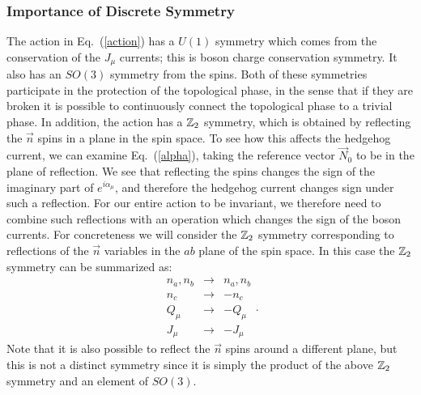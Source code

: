 \subsubsection{Importance of Discrete Symmetry}
\label{subsubsec:HeisSym}

The action in Eq.~(\ref{action}) has a $U(1)$ symmetry which comes from the conservation of the $J_\mu$ currents; this is boson charge conservation symmetry. It also has an $SO(3)$ symmetry from the spins. Both of these symmetries participate in the protection of the topological phase, in the sense that if they are broken it is possible to continuously connect the topological phase to a trivial phase.
In addition, the action has a $\mathbb{Z}_2$ symmetry, which is obtained by reflecting the $\vec{n}$ spins in a plane in the spin space. To see how this affects the hedgehog current, we can examine Eq.~(\ref{alpha}), taking the reference vector $\vec{N}_0$ to be in the plane of reflection. We see that reflecting the spins changes the sign of the imaginary part of $e^{i\alpha_\mu}$, and therefore the hedgehog current changes sign under such a reflection. For our entire action to be invariant, we therefore need to combine such reflections with an operation which changes the sign of the boson currents. For concreteness we will consider the $\mathbb{Z}_2$ symmetry corresponding to reflections of the $\vec{n}$ variables in the $ab$ plane of the spin space. In this case the $\mathbb{Z}_2$ symmetry can be summarized as:
\begin{equation}
\begin{array}{ccc}
n_a,n_b & \rightarrow & n_a,n_b \\
n_c & \rightarrow & -n_c\\
Q_\mu & \rightarrow & -Q_\mu\\
J_\mu & \rightarrow & -J_\mu 
\end{array}.
\label{ztwoeqn}
\end{equation}
Note that it is also possible to reflect the $\vec n$ spins around a different plane, but this is not a distinct symmetry since it is simply the product of the above $\mathbb{Z}_2$ symmetry and an element of $SO(3)$. 

